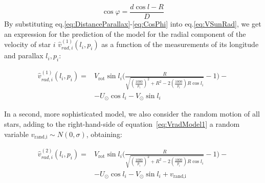 \begin{equation}\label{eq:CosPhi}
    \cos\varphi = \frac{d \cos l - R}{D}
\end{equation}
\noindent
By substituting eq.\ref{eq:DistanceParallax}-\ref{eq:CosPhi} into eq.\ref{eq:VSunRad}, we get an expression for the prediction of the model for the radial component of the velocity of star $i$ $\hat{v}_{rad,i}^{(1)}(l_i, p_i)$ as a function of the measurements of its longitude and parallax $l_i, p_i$:

\begin{equation}\label{eq:VradModel1}
    \begin{aligned}
        \hat{v}_{rad,i}^{(1)}(l_i, p_i) =&  V_{\text{rot}}\sin l_i \biggl( \frac{R}{\sqrt{(\frac{1000}{p_i})^2 + R^2 - 2(\frac{1000}{p_i})R \cos l_i}}-1 \biggr) -\\
        &- U_{\odot}\cos l_i - V_{\odot}\sin l_i
    \end{aligned}
\end{equation}

In a second, more sophisticated model, we also consider the random motion of all stars, adding to the right-hand-side of equation~\ref{eq:VradModel1} a random variable $v_{\text{rand,i}} \sim N(0, \sigma)$, obtaining:

\begin{equation}\label{eq:VradModel2}
    \begin{aligned}
        \hat{v}_{rad,i}^{(2)}(l_i, p_i) =&  V_{\text{rot}}\sin l_i \biggl( \frac{R}{\sqrt{(\frac{1000}{p_i})^2 + R^2 - 2(\frac{1000}{p_i})R \cos l_i}}-1 \biggr) -\\
        &- U_{\odot}\cos l_i - V_{\odot}\sin l_i + v_{\text{rand,i}}
    \end{aligned}
\end{equation}